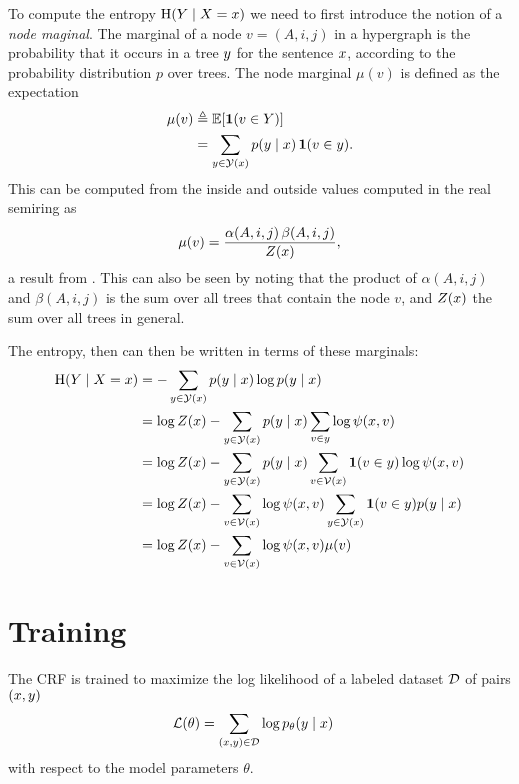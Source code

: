       To compute the entropy $\operatorname{H}(Y \mid X = x)$ we need to first introduce the notion of a \textit{node maginal}. The marginal of a node $v = (A, i, j)$ in a hypergraph is the probability that it occurs in a tree $y$ for the sentence $x$, according to the probability distribution $p$ over trees. The node marginal $\mu(v)$ is defined as the expectation
      \begin{align}
        \label{eq:node-marginal}
        \mu(v)
          &\triangleq \operatorname{\mathbb{E}}[ \operatorname{\mathbf{1}}( v \in Y ) ]  \nonumber \\
          &= \sum_{ y \in \mathcal{Y}(x) } p(y \mid x) \operatorname{\mathbf{1}}( v \in y ).
      \end{align}
      This can be computed from the inside and outside values computed in the real semiring as
      \begin{align}
        \mu(v) = \frac{\alpha(A, i, j) \, \beta(A, i, j)}{Z(x)},
      \end{align}
      a result from \citep{goodman1999semiring}. This can also be seen by noting that the product of $\alpha(A, i, j)$ and $\beta(A, i, j)$ is the sum over all trees that contain the node $v$, and $Z(x)$ the sum over all trees in general.

      The entropy, then can then be written in terms of these marginals:
      \begin{align}
        \label{eq:crf-entropy}
        \operatorname{H}(Y \mid X = x)
          &= - \sum_{ y \in \mathcal{Y}(x) } p(y \mid x) \log p(y \mid x)  \nonumber \\
          &= \log Z(x) - \sum_{ y \in \mathcal{Y}(x) } p(y \mid x) \sum_{v \in y} \log \psi(x, v)  \nonumber \\
          &= \log Z(x) - \sum_{ y \in \mathcal{Y}(x) } p(y \mid x) \sum_{ v \in \mathcal{V}(x) } \operatorname{\mathbf{1}}( v \in y ) \log \psi(x, v)  \nonumber \\
          &= \log Z(x) - \sum_{ v \in \mathcal{V}(x) } \log \psi(x, v)  \sum_{ y \in \mathcal{Y}(x) } \operatorname{\mathbf{1}}( v \in y ) p(y \mid x)  \nonumber \\
          &= \log Z(x) - \sum_{ v \in \mathcal{V}(x) } \log \psi(x, v) \mu(v)
      \end{align}

\section{Training}
  The CRF is trained to maximize the log likelihood of a labeled dataset $\mathcal{D}$ of pairs $(x, y)$
  \begin{align*}
    \mathcal{L}(\theta)
      &= \sum_{(x, y) \in \mathcal{D}} \log p_{\theta}(y \mid x)
  \end{align*}
  with respect to the model parameters $\theta$.

